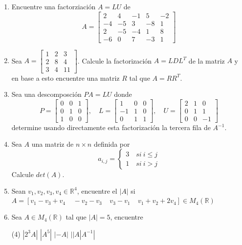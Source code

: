 \documentclass[12pt]{article}
\newenvironment{preguntas}
{\begin{enumerate}\itemsep12pt
	}
	{
	\end{enumerate}
}
\newcommand{\R}{\mathbb{R}}
\begin{document}
\begin{preguntas}
\item Encuentre una factorziación $A = LU$ de
	$$A = \begin{bmatrix}
	2 & 4 & -1 & 5 & -2 \\
	-4 & -5 & 3 & -8 & 1 \\
	2 & -5 & -4 & 1 & 8 \\
	-6 & 0 & 7 & -3 & 1
	\end{bmatrix}$$
\item Sea $A = \begin{bmatrix}
	1 & 2 & 3\\
	2 & 8 & 4 \\
	3 & 4 & 11\end{bmatrix}$. Calcule la factorización $A=LDL^T$ de la matriz $A$ y en base a esto encuentre una matriz $R$ tal que $A = RR^T$.
\item Sea una descomposción $PA = LU$ donde
	$$P = \begin{bmatrix}
	0 & 0 & 1\\
	0 & 1 & 0\\
	1 & 0 & 0
	\end{bmatrix}, \quad
	L = \begin{bmatrix}
	1 & 0 & 0\\
	-1 & 1 & 0\\
	0 & 1 & 1
	\end{bmatrix}, \quad
	U = \begin{bmatrix}
	2 & 1 & 0\\
	0 & 1 & 1\\
	0 & 0 & -1
	\end{bmatrix}$$
	determine usando directamente esta factorización la tercera fila de $A^{-1}$.
\item Sea $A$ una matriz de $n \times n$ definida por
	$$a_{i,j} = 
	\begin{cases}
	3 \quad si\ i\leq j \\
	1 \quad si\ i > j
	\end{cases}$$
	Calcule $det(A)$.
\item Sean $v_1,v_2,v_3,v_4 \in \R^4$, encuentre el $|A|$ si\\
$A=[v_1-v_3+v_4 \;\;\;\;-v_2-v_3 \;\;\;\; v_3-v_1
\;\;\;\;v_1+v_2+2v_4 ]\in M_4 (\R)$
\item Sea $A \in M_4 (\R)$ tal que $|A|=5$, encuentre
\begin{tasks}(4)
\task $|2^3A|$
\task $|A^5|$
\task $|-A|$
\task $||A|A^{-1}|$
\end{tasks}
\end{preguntas}
\end{document}
